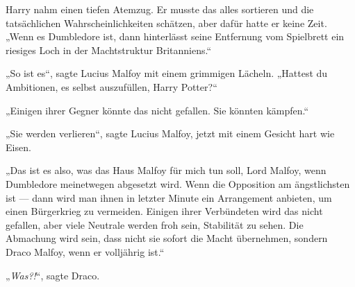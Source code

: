 Harry nahm einen tiefen Atemzug. Er musste das alles sortieren und die tatsächlichen Wahrscheinlichkeiten schätzen, aber dafür hatte er keine Zeit.
„Wenn es Dumbledore ist, dann hinterlässt seine Entfernung vom Spielbrett ein riesiges Loch in der Machtstruktur Britanniens.“

„So ist es“, sagte Lucius Malfoy mit einem grimmigen Lächeln.
„Hattest du Ambitionen, es selbst auszufüllen, Harry Potter?“

„Einigen ihrer Gegner könnte das nicht gefallen. Sie könnten kämpfen.“

„Sie werden verlieren“, sagte Lucius Malfoy, jetzt mit einem Gesicht hart wie Eisen.

„Das ist es also, was das Haus Malfoy für mich tun soll, Lord Malfoy, wenn Dumbledore meinetwegen abgesetzt wird. Wenn die Opposition am ängstlichsten ist — dann wird man ihnen in letzter Minute ein Arrangement anbieten, um einen Bürgerkrieg zu vermeiden. Einigen ihrer Verbündeten wird das nicht gefallen, aber viele Neutrale werden froh sein, Stabilität zu sehen. Die Abmachung wird sein, dass nicht sie sofort die Macht übernehmen, sondern Draco Malfoy, wenn er volljährig ist.“

„\emph{Was?!}“, sagte Draco.

